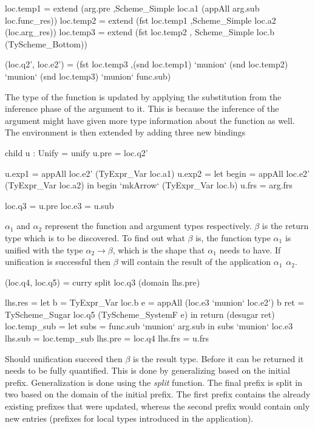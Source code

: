 \begin{code}
loc.temp1 = extend (arg.pre
                   ,Scheme_Simple loc.a1 (appAll arg.sub loc.func_res))
loc.temp2 = extend (fst loc.temp1
                   ,Scheme_Simple loc.a2 (loc.arg_res))
loc.temp3 = extend (fst loc.temp2
                   , Scheme_Simple loc.b  (TyScheme_Bottom))
    
(loc.q2', loc.e2') 
   = (fst loc.temp3
     ,(snd loc.temp1) `munion` (snd loc.temp2) `munion` (snd loc.temp3) `munion` func.sub)
\end{code}
The type of the function is updated by applying the substitution from the inference phase of the argument to it. This is because the inference of the argument might have given more type information about the function as well. The environment is then extended by adding three new bindings 

\begin{code}
child u : Unify = unify
u.pre   = loc.q2'
       
u.exp1  = appAll loc.e2' (TyExpr_Var loc.a1)
u.exp2  =  let begin = appAll loc.e2' (TyExpr_Var loc.a2)
           in begin `mkArrow` (TyExpr_Var loc.b)
u.frs   = arg.frs
       
loc.q3  = u.pre
loc.e3  = u.sub
\end{code}
$\alpha_1$ and $\alpha_2$ represent the function and argument types respectively. $\beta$ is the return type which is to be discovered. To find out what $\beta$ is, the function type $\alpha_1$ is unified with the type $\alpha_2 \rightarrow \beta$, which is the shape that $\alpha_1$ needs to have. If unification is successful then $\beta$ will contain the result of the application $\alpha_1 \hspace{5pt} \alpha_2$.


\begin{code}       
(loc.q4, loc.q5) = curry split loc.q3 (domain lhs.pre)
 
lhs.res =  let  b    = TyExpr_Var loc.b
                e    = appAll (loc.e3 `munion` loc.e2') b
                ret  = TyScheme_Sugar loc.q5 (TyScheme_SystemF e)
           in return (desugar ret)
loc.temp_sub =  let subs = func.sub `munion` arg.sub 
                in subs `munion` loc.e3
lhs.sub = loc.temp_sub
lhs.pre = loc.q4
lhs.frs = u.frs
\end{code}
Should unification succeed then $\beta$ is the result type. Before it can be returned it needs to be fully quantified. This is done by generalizing based on the initial prefix. Generalization is done using the \emph{split} function. The final prefix is split in two based on the domain of the initial prefix. The first prefix contains the already existing prefixes that were updated, whereas the second prefix would contain only new entries (prefixes for local types introduced in the application).


